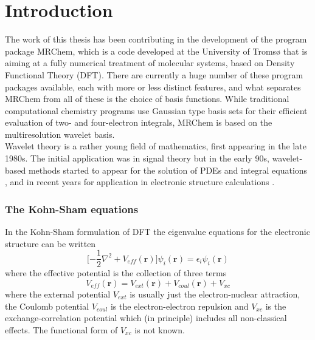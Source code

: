 \chapter{Introduction}
The work of this thesis has been contributing in the development of the 
program package MRChem, which is a code developed at the University of Tromsø 
\cite{Fossgaard} that is aiming at a fully numerical treatment of molecular 
systems, based on 
Density Functional Theory (DFT). There are currently a huge number of these
program packages available, each with more or less distinct features, and
what separates MRChem from all of these is the choice of basis functions.
While traditional computational chemistry programs use Gaussian type basis sets
for their efficient evaluation of two- and four-electron integrals, MRChem is
based on the multiresolution wavelet basis.\\

\noindent
Wavelet theory is a rather young field of mathematics, first appearing in the
late 1980s. The initial application was in signal theory \cite{Strang} but in
the early 90s, wavelet-based methods started to appear for the solution of
PDEs and integral equations \cite{Beylkin90}\cite{Alpert93}, and in recent 
years for application in electronic structure calculations
\cite{Harrison}\cite{Niklasson}\cite{Arias}.

\subsection*{The Kohn-Sham equations}
In the Kohn-Sham \cite{Kohn-Sham} formulation of DFT the eigenvalue equations 
for the electronic structure can be written
\begin{equation}
	\label{eq:Kohn-Sham}
	\lbrack
	-\frac{1}{2}\nabla^2+V_{eff}(\boldsymbol{r})\rbrack\psi_i(\boldsymbol{r}) =
	\epsilon_i\psi_i(\boldsymbol{r})
\end{equation}
where the effective potential is the collection of three terms
\begin{equation}
	\label{eq:Veff}
	V_{eff}(\boldsymbol{r}) =
	V_{ext}(\boldsymbol{r})+V_{coul}(\boldsymbol{r})+V_{xc}
\end{equation}
where the external potential $V_{ext}$ is usually just the electron-nuclear
attraction, the Coulomb potential $V_{coul}$ is the electron-electron
repulsion and $V_{xc}$ is the exchange-correlation potential which (in
principle) includes all non-classical effects. The functional form of $V_{xc}$
is not known.\\

